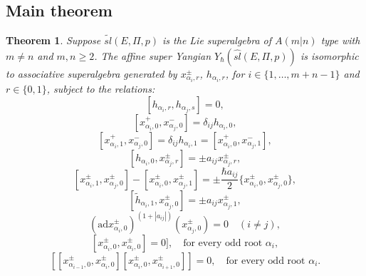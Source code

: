\documentclass[english]{elsarticle}
\newtheorem{theorem}{Theorem}[section]
\numberwithin{equation}{section}
\begin{document}




\subsection{Main theorem}


\begin{theorem} \label{thm_3.2}
Suppose $\tilde{sl}(E,\Pi,p)$ is the Lie superalgebra of $A(m|n)$ type with $m\neq n$ and $m,n\geq 2$. The affine super Yangian $Y_{\hbar}(\hat{sl}(E,\Pi,p))$ is isomorphic to associative superalgebra generated by $x_{\alpha_{i},r}^{\pm}$, $h_{\alpha_{i},r}$, for $i \in \{1,\ldots,m+n-1 \}$ and $r \in \{0,1 \}$, subject to the relations:
\begin{equation}
\label{rel:35}
    [h_{\alpha_{i},r},h_{\alpha_{j},s}]=0,
\end{equation}
\begin{equation}
\label{rel:36}
    [x_{\alpha_{i},0}^{+},x_{\alpha_{j},0}^{-}]=\delta_{ij}h_{\alpha_i,0},
\end{equation}
\begin{equation}
\label{rel:37}
    [x_{\alpha_{i},1}^{+},x_{\alpha_{j},0}^{-}]=\delta_{ij}h_{\alpha_{i},1}=[x_{\alpha_{i},0}^{+},x_{\alpha_{j},1}^{-}],
\end{equation}
\begin{equation}
\label{rel:38}
    [h_{\alpha_{i},0},x_{\alpha_j,r}^{\pm}]=\pm a_{ij}x_{\alpha_j,r}^{\pm},
\end{equation}
\begin{equation}
\label{rel:39}
    [x_{\alpha_{i},1}^{\pm},x_{\alpha_{j},0}^{\pm}]-[x_{\alpha_{i},0}^{\pm},x_{\alpha_{j},1}^{\pm}]=\pm \frac{ \hbar a_{ij}}{2}\{x_{\alpha_{i},0}^{\pm},x_{\alpha_{j},0}^{\pm}\},
\end{equation}
\begin{equation}
\label{rel:40}
    [\tilde{h}_{\alpha_i,1},x_{\alpha_j,0}^{\pm}]=\pm a_{ij}x_{\alpha_j,1}^{\pm},
\end{equation}
\begin{equation}
\label{rel:41}
    (\text{ad} x_{\alpha_i,0}^{\pm})^{(1+|a_{ij}|)}(x_{\alpha_j,0}^{\pm}) = 0\quad (i \neq j),
\end{equation}
\begin{equation}
\label{rel:42}
    [x_{\alpha_i,0}^{\pm},x_{\alpha_i,0}^{\pm}]=0 ],\quad \text{for every odd root $\alpha_i$},
\end{equation}
\begin{equation}
\label{rel:43}
    [[x_{\alpha_{i-1},0}^{\pm},x_{\alpha_i,0}^{\pm}][x_{\alpha_i,0}^{\pm},x_{\alpha_{i+1},0}^{\pm}]]=0, \quad \text{for every odd root $\alpha_i$}.
\end{equation}
\end{theorem}
\end{document}
